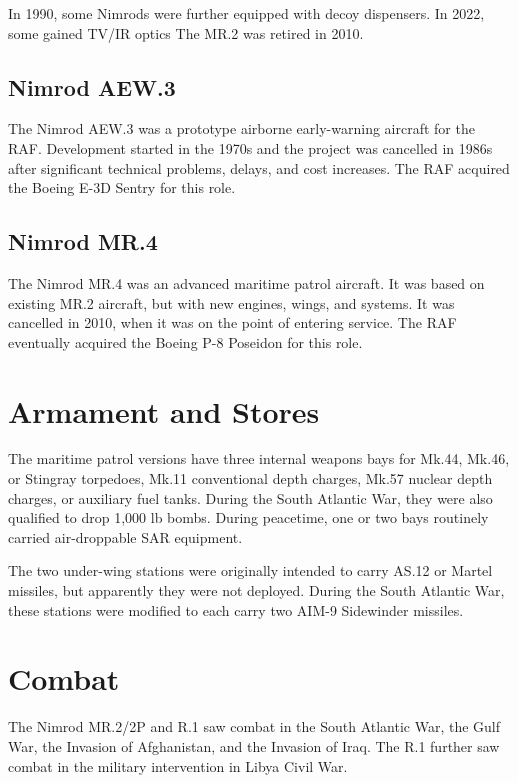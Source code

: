 In 1990, some Nimrods were further equipped with decoy dispensers. In 2022, some gained TV/IR optics The MR.2 was retired in 2010.

\subsection{Nimrod AEW.3}

The Nimrod AEW.3 was a prototype airborne early-warning aircraft for the RAF. Development started in the 1970s and the project was cancelled in 1986s after significant technical problems, delays, and cost increases. The RAF acquired the Boeing E-3D Sentry for this role.

\subsection{Nimrod MR.4}

The Nimrod MR.4 was an advanced maritime patrol aircraft. It was based on existing MR.2 aircraft, but with new engines, wings, and systems. It was cancelled in 2010, when it was on the point of entering service. The RAF eventually acquired the Boeing P-8 Poseidon for this role.

\section{Armament and Stores}

The maritime patrol versions have three internal weapons bays for Mk.44, Mk.46, or Stingray torpedoes, Mk.11 conventional depth charges, Mk.57 nuclear depth charges, or auxiliary fuel tanks. During the South Atlantic War, they were also qualified to drop 1,000 lb bombs. During peacetime, one or two bays routinely carried air-droppable SAR equipment.

The two under-wing stations were originally intended to carry AS.12 or Martel missiles, but apparently they were not deployed. During the South Atlantic War, these stations were modified to each carry two AIM-9 Sidewinder missiles.

\section{Combat}

The Nimrod MR.2/2P and R.1 saw combat in the South Atlantic War, the Gulf War, the Invasion of Afghanistan, and the Invasion of Iraq. The R.1 further saw combat in the military intervention in Libya Civil War.

